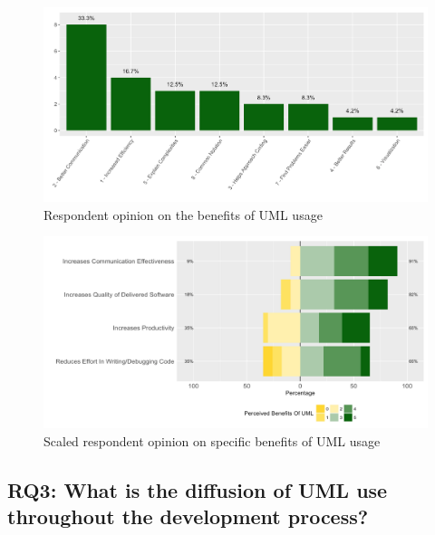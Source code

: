 \documentclass[letterpaper, 10 pt, conference]{ieeeconf}  %
\begin{document}
	\begin{figure}[!htb]
      \centering
      \includegraphics[scale=0.25]{Plots/BenefitsPlot}
      \caption{Respondent opinion on the benefits of UML usage}
      \label{BenefitsUML}
   \end{figure}
   
   \begin{figure}[!htb]
      \centering
      \includegraphics[scale=0.25]{Plots/LikertPlot.png}
      \caption{Scaled respondent opinion on specific benefits of UML usage}
      \label{OpCodeUML}
   \end{figure}
   
\subsection{RQ3: What is the diffusion of UML use throughout the development process?}
\end{document}
